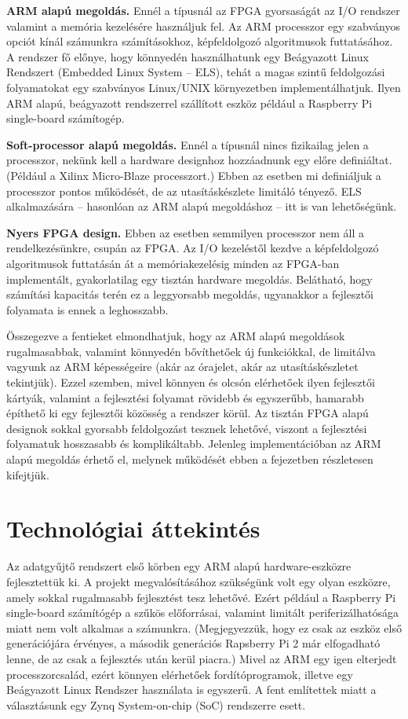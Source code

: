 \documentclass[a4paper,12pt]{report}
\begin{document}
{\bf{ARM alapú megoldás.}} Ennél a típusnál az FPGA gyorsaságát az I/O rendszer valamint a memória kezelésére használjuk fel. Az ARM processzor egy szabványos opciót kínál számunkra számításokhoz, képfeldolgozó algoritmusok futtatásához. A rendszer fő előnye, hogy könnyedén használhatunk egy Beágyazott Linux Rendszert (Embedded Linux System -- ELS), tehát a magas szintű feldolgozási folyamatokat egy szabványos Linux/UNIX környezetben implementálhatjuk. Ilyen ARM alapú, beágyazott rendszerrel szállított eszköz például a Raspberry Pi single-board számítogép.

{\bf{Soft-processor alapú megoldás.}} Ennél a típusnál nincs fizikailag jelen a processzor, nekünk kell a hardware designhoz hozzáadnunk egy előre definiáltat. (Például a Xilinx Micro-Blaze processzort.) Ebben az esetben mi definiáljuk a processzor pontos működését, de az utasításkészlete limitáló tényező. ELS alkalmazására -- hasonlóan az ARM alapú megoldáshoz -- itt is van lehetőségünk.

{\bf{Nyers FPGA design.}} Ebben az esetben semmilyen processzor nem áll a rendelkezésünkre, csupán az FPGA. Az I/O kezeléstől kezdve a képfeldolgozó algoritmusok futtatásán át a memóriakezelésig minden az FPGA-ban implementált, gyakorlatilag egy tisztán hardware megoldás. Belátható, hogy számítási kapacitás terén ez a leggyorsabb megoldás, ugyanakkor a fejlesztői folyamata is ennek a leghosszabb.

Összegezve a fentieket elmondhatjuk, hogy az ARM alapú megoldások rugalmasabbak, valamint könnyedén bővíthetőek új funkciókkal, de limitálva vagyunk az ARM képességeire (akár az órajelet, akár az utasításkészletet tekintjük).  Ezzel szemben, mivel könnyen és olcsón elérhetőek ilyen fejlesztői kártyák, valamint a fejlesztési folyamat rövidebb és egyszerűbb, hamarabb építhető ki egy fejlesztői közösség a rendszer körül. Az tisztán FPGA alapú designok sokkal gyorsabb feldolgozást tesznek lehetővé, viszont a fejlesztési folyamatuk hosszasabb és komplikáltabb. Jelenleg implementációban az ARM alapú megoldás érhető el, melynek működését ebben a fejezetben részletesen kifejtjük.

\section{Technológiai áttekintés}

Az adatgyűjtő rendszert első körben egy ARM alapú hardware-eszközre fejlesztettük ki. A projekt megvalósításához szükségünk volt egy olyan eszközre, amely sokkal rugalmasabb fejlesztést tesz lehetővé. Ezért például a Raspberry Pi single-board számítógép a szűkös előforrásai, valamint limitált periferizálhatósága miatt nem volt alkalmas a számunkra. (Megjegyezzük, hogy ez csak az eszköz első generációjára érvényes, a második generációs Rapsberry Pi 2 már elfogadható lenne, de az csak a fejlesztés után kerül piacra.) Mivel az ARM egy igen elterjedt processzorcsalád, ezért könnyen elérhetőek fordítóprogramok, illetve egy Beágyazott Linux Rendszer használata is egyszerű. A fent említettek miatt a választásunk egy Zynq System-on-chip (SoC) rendszerre esett.
\end{document}
